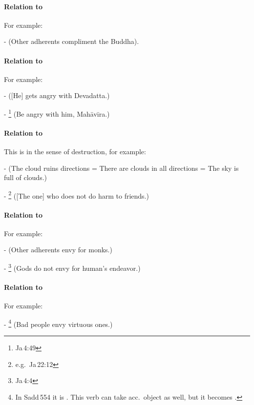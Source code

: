 \paragraph*{Relation to } For example:\par
-  (Other adherents compliment the Buddha).

\paragraph*{Relation to } For example:\par
-  ([He] gets angry with Devadatta.)\par
- \footnote{Ja\,4:49} (Be angry with him, Mah\=av\=ira.)\par

\paragraph*{Relation to } This is in the sense of destruction, for example:\par
-  (The cloud ruins directions = There are clouds in all directions = The sky is full of clouds.)\par
- \footnote{e.g.\ Ja\,22:12} ([The one] who does not do harm to friends.)\par
								 
\paragraph*{Relation to } For example:\par
-  (Other adherents envy for monks.)\par
- \footnote{Ja\,4:4} (Gods do not envy for human's endeavor.)\par
								 
\paragraph*{Relation to } For example:\par
- \footnote{In Sadd\,554 it is . This verb can take acc.\ object as well, but it becomes .} (Bad people envy virtuous ones.)\par
								 
